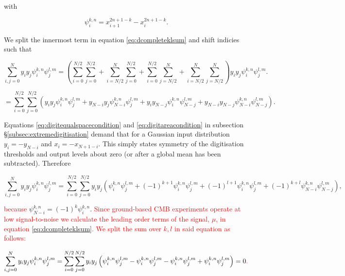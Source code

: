 \documentclass[apj]{emulateapj}
\newcommand{\changed}[1]{\textcolor{Red}{#1}}
\begin{document}
with

\begin{equation}
\psi_i^{k,n} = x_{i+1}^{2n+1-k} - x_{i}^{2n+1-k}.
\end{equation}

We split the innermost term in equation \ref{eq:dcompleteklsum} and shift indicies such that

\begin{equation}
\sum_{i,j = 0}^N y_i y_j \psi_i^{k, n} \psi_j^{l, m} = \left( \sum_{i = 0}^{N/2}\sum_{j = 0}^{N/2} + \sum_{i = N/2}^{N}\sum_{j = 0}^{N/2} + \sum_{i = 0}^{N/2}\sum_{j = N/2}^{N} + \sum_{i = N/2}^{N}\sum_{j = N/2}^{N} \right) y_i y_j \psi_i^{k, n} \psi_j^{l, m}.
\end{equation}

\begin{equation}
= \sum_{i = 0}^{N/2}\sum_{j = 0}^{N/2} \left( y_i y_j \psi_i^{k, n} \psi_j^{l, m} +  y_{N-i} y_j \psi_{N-i}^{k, n} \psi_j^{l, m} + y_i y_{N-j} \psi_i^{k, n} \psi_{N-j}^{l, m} + y_{N-i} y_{N-j} \psi_{N-i}^{k, n} \psi_{N-j}^{l, m} \right).
\end{equation}

Equations \ref{eq:digitequalspacecondition} and \ref{eq:digitareacondition} in subsection \S\ref{subsec:extremedigitisation} demand that for a Gaussian input distribution $y_i = -y_{N-i}$ and $x_i = -x_{N+1-i}$. This simply states symmetry of the digitisation thresholds and output levels about zero (or after a global mean has been subtracted). Therefore

\begin{equation} \label{eq:ijsumpsiflip}
\sum_{i,j = 0}^N y_i y_j \psi_i^{k, n} \psi_j^{l, m} = \sum_{i = 0}^{N/2}\sum_{j = 0}^{N/2} y_i y_j \left( \psi_i^{k, n} \psi_j^{l, m} + (-1)^{k+1} \psi_{i}^{k, n} \psi_j^{l, m} + (-1)^{l+1} \psi_i^{k, n} \psi_{j}^{l, m} + (-1)^{k+l} \psi_{N-i}^{k, n} \psi_{N-j}^{l, m} \right),
\end{equation}

\changed{because} $\psi_{N-i}^{k,n} = (-1)^{k} \psi_{i}^{k,n}$. \changed{Since ground-based CMB experiments operate at low signal-to-noise we calculate the leading order terms of the signal, $\mu$, in equation \ref{eq:dcompleteklsum}. We split the sum over $k, l$ in said equation as follows:}

\begin{equation}
\sum_{i,j = 0}^N y_i y_j \psi_i^{k, n} \psi_j^{l, m} = \sum_{i = 0}^{N/2}\sum_{j = 0}^{N/2} y_i y_j  \left( \psi_i^{k, n} \psi_j^{l, m} - \psi_{i}^{k, n} \psi_j^{l, m} - \psi_i^{k, n} \psi_{j}^{l, m} + \psi_{i}^{k, n} \psi_{j}^{l, m} \right) = 0 \changed{.}
\end{equation}
\end{document}
